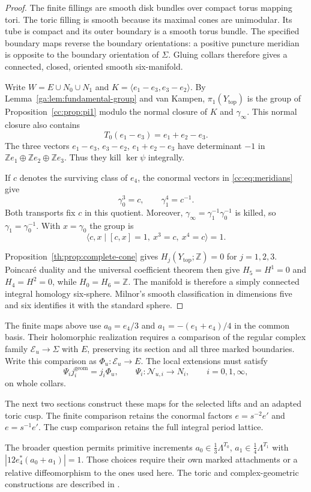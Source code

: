 \begin{proof}
The finite fillings are smooth disk bundles over compact torus mapping
tori. The toric filling is smooth because its maximal cones are
unimodular. Its tube is compact and its outer boundary is a smooth
torus bundle. The specified boundary maps reverse the boundary
orientations: a positive puncture meridian is opposite to the boundary
orientation of $\Sigma$. Gluing collars therefore gives a connected,
closed, oriented smooth six-manifold.

Write $W=E\cup N_0\cup N_1$ and
$K=\langle e_1-e_3,e_3-e_2\rangle$. By
Lemma~\ref{ga:lem:fundamental-group} and van Kampen,
$\pi_1(Y_{\mathrm{top}})$ is the group of
Proposition~\ref{cc:prop:pi1} modulo the normal closure of $K$ and
$\gamma_\infty$. This normal closure also contains
\[
 T_0(e_1-e_3)=e_1+e_2-e_3.
\]
The three vectors $e_1-e_3$, $e_3-e_2$, $e_1+e_2-e_3$ have
determinant $-1$ in $\mathbb Ze_1\oplus\mathbb Ze_2\oplus\mathbb Ze_3$.
Thus they kill $\ker\psi$ integrally.

If $c$ denotes the surviving
class of $e_4$, the conormal vectors in
\eqref{cc:eq:meridians} give
\[
 \gamma_0^3=c,\qquad \gamma_1^4=c^{-1}.
\]
Both transports fix $c$ in this quotient. Moreover,
$\gamma_\infty=\gamma_1^{-1}\gamma_0^{-1}$ is killed, so
$\gamma_1=\gamma_0^{-1}$. With $x=\gamma_0$ the group is
\[
 \langle c,x\mid[c,x]=1,\ x^3=c,\ x^4=c\rangle=1.
\]

Proposition~\ref{th:prop:complete-cone} gives
$H_j(Y_{\mathrm{top}};\mathbb Z)=0$ for $j=1,2,3$.
Poincar\'e duality and the universal coefficient theorem then give
$H_5=H^1=0$ and $H_4=H^2=0$, while $H_0=H_6=\mathbb Z$.
The manifold is therefore a simply connected integral homology
six-sphere. Milnor's smooth classification in dimensions five and six
\cite[\S9, Proposition B, pp.~109--110]{MilnorHC}
identifies it with the standard sphere.
\end{proof}

The finite maps above use $a_0=e_4/3$ and
$a_1=-(e_1+e_4)/4$ in the common basis. Their holomorphic
realization requires a comparison of the regular complex family
$\mathcal E_u\to\Sigma$ with $E$, preserving its section and all
three marked boundaries. Write this comparison as
$\Phi_u:\mathcal E_u\to E$. The local extensions must satisfy
\[
 \Psi_i j_i^{\mathrm{geom}}=j_i\Phi_u,
 \qquad \Psi_i:\mathcal N_{u,i}\to N_i,
 \qquad i=0,1,\infty,
\]
on whole collars.

The next two sections construct these maps for
the selected lifts and an adapted toric cusp. The finite comparison
retains the conormal factors $e=s^{-2}e'$ and $e=s^{-1}e'$.
The cusp comparison retains the full integral period lattice.

The broader question permits primitive increments
$a_0\in\frac13\Lambda^{T_0}$, $a_1\in\frac14\Lambda^{T_1}$
with $|12e_4^*(a_0+a_1)|=1$. Those choices require their own
marked attachments or a relative diffeomorphism to the ones used
here. The toric and complex-geometric constructions are described
in \cite[Sections 2--4]{Engel}.

